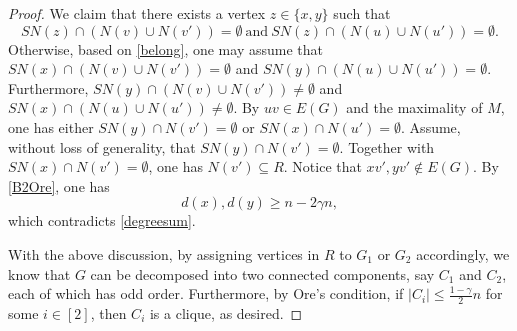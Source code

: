 \documentclass[10pt,a4paper]{amsart}
\begin{document}
\begin{proof}
We claim that there exists a vertex $z\in \{x,y\}$ such that 
$$
SN(z)\cap (N(v)\cup N(v'))=\emptyset\ \text{and}\ SN(z)\cap (N(u)\cup N(u'))=\emptyset.
$$ 
Otherwise, based on \eqref{belong}, one may assume that $SN(x)\cap (N(v)\cup N(v'))=\emptyset$ and $SN(y)\cap (N(u)\cup N(u'))=\emptyset$. Furthermore, $SN(y)\cap (N(v)\cup N(v'))\neq \emptyset$ and $SN(x)\cap (N(u)\cup N(u'))\neq \emptyset$. By $uv\in E(G)$ and the maximality of $M$, one has either $SN(y)\cap N(v')=\emptyset$ or $SN(x)\cap N(u')=\emptyset$. 
Assume, without loss of generality, that $SN(y)\cap N(v')=\emptyset$. %
Together with $SN(x)\cap N(v')=\emptyset$, one has $N(v')\subseteq R$. Notice that  $xv',yv'\notin E(G)$. By  \eqref{B2Ore}, one has $$d(x),d(y)\geq n-2\gamma n,$$
which contradicts \eqref{degreesum}. %

With the above discussion, by assigning vertices in $R$ to $G_1$ or $G_2$ accordingly, we know that $G$ can be decomposed into two connected components, say $C_1$ and $C_2$, each of which has odd order.
Furthermore, by Ore's condition, if $|C_i|\leq \frac{1-\gamma}{2}n$ for some $i\in [2]$, then $C_i$ is a clique, as desired.
\end{proof}
\end{document}
